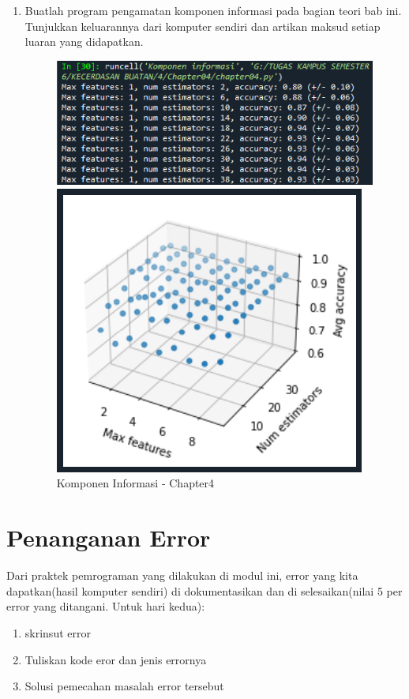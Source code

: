 \begin{enumerate}
	\item Buatlah program pengamatan komponen informasi pada bagian teori bab ini. Tunjukkan keluarannya dari komputer sendiri dan artikan maksud setiap luaran yang didapatkan.
	\begin{figure}[ht]
		\centerline{\includegraphics[scale=0.7]{figures/chappter4-8.png}}
		\centerline{\includegraphics[scale=0.7]{figures/chappter4-8a.png}}
		\caption{Komponen Informasi - Chapter4}
		\label{Komponen Informasi - Chapter4}
	\end{figure}
\end{enumerate}


\section{Penanganan Error}
Dari praktek pemrograman yang dilakukan di modul ini, error yang kita dapatkan(hasil komputer sendiri) di dokumentasikan dan di selesaikan(nilai 5 per error yang ditangani. Untuk hari kedua):

\begin{enumerate}
	\item skrinsut error
	\item Tuliskan kode eror dan jenis errornya
	\item Solusi pemecahan masalah error tersebut
\end{enumerate}

